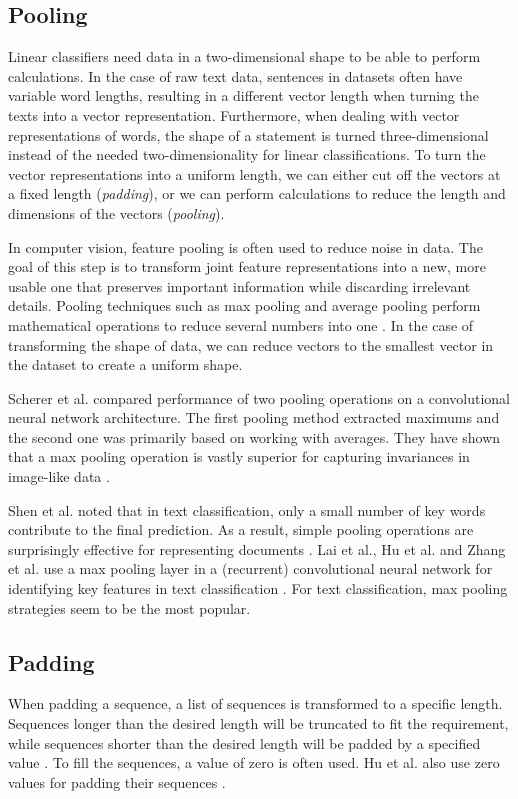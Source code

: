\subsection{Pooling}
Linear classifiers need data in a two-dimensional shape to be able to perform calculations. 
In the case of raw text data, sentences in datasets often have variable word lengths, resulting in a different vector length when turning the texts into a vector representation.
Furthermore, when dealing with vector representations of words, the shape of a statement is turned three-dimensional instead of the needed two-dimensionality for linear classifications.
To turn the vector representations into a uniform length, we can either cut off the vectors at a fixed length (\textit{padding}), or we can perform calculations to reduce the length and dimensions of the vectors (\textit{pooling}).

In computer vision, feature pooling is often used to reduce noise in data. 
The goal of this step is to transform joint feature representations into a new, more usable one that preserves important information while discarding irrelevant details.
Pooling techniques such as max pooling and average pooling perform mathematical operations to reduce several numbers into one \cite{boureau2010}. 
In the case of transforming the shape of data, we can reduce vectors to the smallest vector in the dataset to create a uniform shape.

Scherer et al. compared performance of two pooling operations on a convolutional neural network architecture. 
The first pooling method extracted maximums and the second one was primarily based on working with averages.
They have shown that a max pooling operation is vastly superior for capturing invariances in image-like data \cite{scherer2010}.

Shen et al. noted that in text classification, only a small number of key words contribute to the final prediction.
As a result, simple pooling operations are surprisingly effective for representing documents \cite{shen2018}.  
Lai et al., Hu et al. and Zhang et al. use a max pooling layer in a (recurrent) convolutional neural network for identifying key features in text classification \cite{lai2015}\cite{hu2014}\cite{zhang2015}. 
For text classification, max pooling strategies seem to be the most popular. 

\subsection{Padding}
When padding a sequence, a list of sequences is transformed to a specific length. 
Sequences longer than the desired length will be truncated to fit the requirement, while sequences shorter than the desired length will be padded by a specified value \cite{keraspad}. 
To fill the sequences, a value of zero is often used. Hu et al. also use zero values for padding their sequences \cite{hu2014}. 

